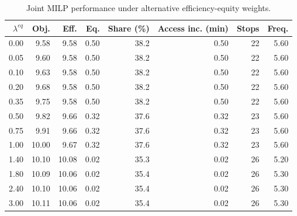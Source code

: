 \begin{table}[htbp]
\centering
\small
\caption{Joint MILP performance under alternative efficiency-equity weights.}
\label{tab:route438_equity_weight}
\begin{tabular}{rrrrrrrr}
\toprule
\(\lambda^{eq}\) & Obj. & Eff. & Eq. & Share (\%) & Access inc. (min) & Stops & Freq. \\
\midrule
0.00 & 9.58 & 9.58 & 0.50 & 38.2 & 0.50 & 22 & 5.60 \\
0.05 & 9.60 & 9.58 & 0.50 & 38.2 & 0.50 & 22 & 5.60 \\
0.10 & 9.63 & 9.58 & 0.50 & 38.2 & 0.50 & 22 & 5.60 \\
0.20 & 9.68 & 9.58 & 0.50 & 38.2 & 0.50 & 22 & 5.60 \\
0.35 & 9.75 & 9.58 & 0.50 & 38.2 & 0.50 & 22 & 5.60 \\
0.50 & 9.82 & 9.66 & 0.32 & 37.6 & 0.32 & 23 & 5.60 \\
0.75 & 9.91 & 9.66 & 0.32 & 37.6 & 0.32 & 23 & 5.60 \\
1.00 & 10.00 & 9.67 & 0.32 & 37.6 & 0.32 & 23 & 5.60 \\
1.40 & 10.10 & 10.08 & 0.02 & 35.3 & 0.02 & 26 & 5.20 \\
1.80 & 10.09 & 10.06 & 0.02 & 35.4 & 0.02 & 26 & 5.30 \\
2.40 & 10.10 & 10.06 & 0.02 & 35.4 & 0.02 & 26 & 5.30 \\
3.00 & 10.11 & 10.06 & 0.02 & 35.4 & 0.02 & 26 & 5.30 \\
\bottomrule
\end{tabular}
\end{table}
